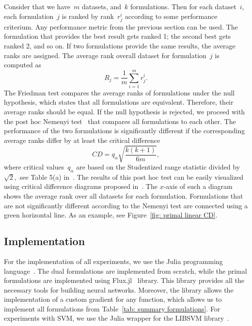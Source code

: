 Consider that we have~$m$ datasets, and~$k$ formulations. Then for each dataset~$i$, each formulation~$j$ is ranked by rank~$r^i_j$ according to some performance criterium. Any performance metric from the previous section can be used. The formulation that provides the best result gets ranked 1; the second best gets ranked 2, and so on. If two formulations provide the same results, the average ranks are assigned. The average rank overall dataset for formulation~$j$ is computed as
\begin{equation*}
  R_j = \frac{1}{m} \sum_{i = 1}^{m} r^{i}_{j}.
\end{equation*}
The Friedman test compares the average ranks of formulations under the null hypothesis, which states that all formulations are equivalent. Therefore, their average ranks should be equal. If the null hypothesis is rejected, we proceed with the post hoc Nemenyi test~\cite{nemenyi1963distribution} that compares all formulations to each other. The performance of the two formulations is significantly different if the corresponding average
ranks differ by at least the critical difference
\begin{equation*}
  CD = q_{\alpha} \sqrt{\frac{k(k + 1)}{6m}},
\end{equation*}
where critical values~$q_{\alpha}$ are based on the Studentized range statistic divided by~$\sqrt{2},$ see Table 5(a) in~\cite{demvsar2006statistical}. The results of this post hoc test can be easily visualized using critical difference diagrams proposed in~\cite{demvsar2006statistical}. The $x$-axis of such a diagram shows the average rank over all datasets for each formulation. Formulations that are not significantly different according to the Nemenyi test are connected using a green horizontal line. As an example, see Figure~\ref{fig: primal linear CD}.

\subsection{Implementation}

For the implementation of all experiments, we use the Julia programming language~\cite{bezanson2017julia}. The dual formulations are implemented from scratch, while the primal formulations are implemented using Flux.jl~\cite{innes:2018, Flux.jl-2018} library. This library provides all the necessary tools for building neural networks. Moreover, the library allows the implementation of a custom gradient for any function, which allows us to implement all formulations from Table~\ref{tab: summary formulations}. For experiments with SVM, we use the Julia wrapper for the LIBSVM library~\cite{chang2011libsvm}.

